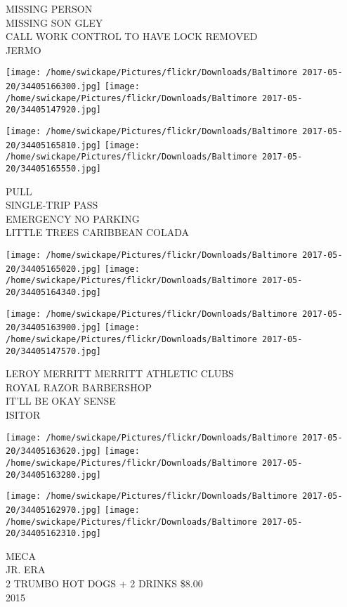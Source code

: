 \documentclass[10pt,letterpaper]{article}
\begin{document}
MISSING PERSON\\
MISSING SON GLEY\\
CALL WORK CONTROL TO HAVE LOCK REMOVED\\
JERMO\\
\pagebreak

\texttt{[image: /home/swickape/Pictures/flickr/Downloads/Baltimore 2017-05-20/34405166300.jpg]}
\texttt{[image: /home/swickape/Pictures/flickr/Downloads/Baltimore 2017-05-20/34405147920.jpg]}

\texttt{[image: /home/swickape/Pictures/flickr/Downloads/Baltimore 2017-05-20/34405165810.jpg]}
\texttt{[image: /home/swickape/Pictures/flickr/Downloads/Baltimore 2017-05-20/34405165550.jpg]}

PULL\\
SINGLE{-}TRIP PASS\\
EMERGENCY NO PARKING\\
LITTLE TREES CARIBBEAN COLADA\\
\pagebreak

\texttt{[image: /home/swickape/Pictures/flickr/Downloads/Baltimore 2017-05-20/34405165020.jpg]}
\texttt{[image: /home/swickape/Pictures/flickr/Downloads/Baltimore 2017-05-20/34405164340.jpg]}

\texttt{[image: /home/swickape/Pictures/flickr/Downloads/Baltimore 2017-05-20/34405163900.jpg]}
\texttt{[image: /home/swickape/Pictures/flickr/Downloads/Baltimore 2017-05-20/34405147570.jpg]}

LEROY MERRITT MERRITT ATHLETIC CLUBS\\
ROYAL RAZOR BARBERSHOP\\
IT'LL BE OKAY SENSE\\
ISITOR\\
\pagebreak

\texttt{[image: /home/swickape/Pictures/flickr/Downloads/Baltimore 2017-05-20/34405163620.jpg]}
\texttt{[image: /home/swickape/Pictures/flickr/Downloads/Baltimore 2017-05-20/34405163280.jpg]}

\texttt{[image: /home/swickape/Pictures/flickr/Downloads/Baltimore 2017-05-20/34405162970.jpg]}
\texttt{[image: /home/swickape/Pictures/flickr/Downloads/Baltimore 2017-05-20/34405162310.jpg]}

MECA\\
JR. ERA\\
2 TRUMBO HOT DOGS + 2 DRINKS \$8.00\\
2015\\
\pagebreak
\end{document}
